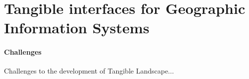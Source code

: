 \documentclass{article}
\begin{document}

\section{Tangible interfaces for Geographic Information Systems}



















\paragraph{Challenges}

Challenges to the development of Tangible Landscape...
\end{document}
